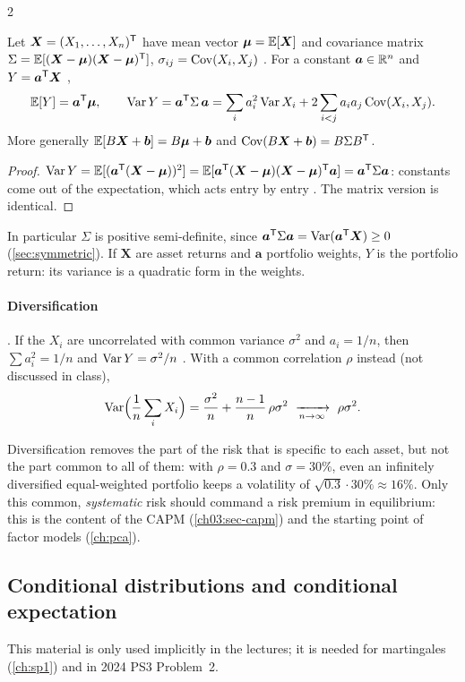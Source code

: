 \begin{paracol}{2}
\begin{proposition}\label{ch03:prop-portvar}
Let $\bm X=(X_1,\dots,X_n)^{\mathsf T}$ have mean vector $\bm\mu=\mathbb{E}[\bm X]$ and covariance matrix
$\Sigma=\mathbb{E}[(\bm X-\bm\mu)(\bm X-\bm\mu)^{\mathsf T}]$, $\sigma_{ij}=\operatorname{Cov}(X_i,X_j)$ . For a constant $\bm a\in\mathbb{R}^n$ and
$Y=\bm a^{\mathsf T}\bm X$ ,
\[
  \mathbb{E}[Y]=\bm a^{\mathsf T}\bm\mu,\qquad
  \operatorname{Var} Y=\bm a^{\mathsf T}\Sigma\,\bm a=\sum_ia_i^2\operatorname{Var} X_i+2\sum_{i<j}a_ia_j\operatorname{Cov}(X_i,X_j) .
\]
More generally $\mathbb{E}[B\bm X+\bm b]=B\bm\mu+\bm b$ and $\operatorname{Cov}(B\bm X+\bm b)=B\Sigma B^{\mathsf T}$.
\end{proposition}
\begin{proof}
$\operatorname{Var} Y=\mathbb{E}[(\bm a^{\mathsf T}(\bm X-\bm\mu))^2]=\mathbb{E}[\bm a^{\mathsf T}(\bm X-\bm\mu)(\bm X-\bm\mu)^{\mathsf T}\bm a]=\bm a^{\mathsf T}\Sigma\bm a$: constants come out of the
expectation, which acts entry by entry . The matrix version is identical.
\end{proof}
In particular $\Sigma$ is positive semi-definite, since $\bm a^{\mathsf T}\Sigma\bm a=\operatorname{Var}(\bm a^{\mathsf T}\bm X)\ge0$ (\cref{sec:symmetric}).
If $\bm X$ are asset returns and $\bm a$ portfolio weights, $Y$ is the portfolio return: its variance is a
quadratic form in the weights.

\paragraph{Diversification} . If the $X_i$ are uncorrelated with common variance
$\sigma^2$ and $a_i=1/n$, then $\sum a_i^2=1/n$ and $\operatorname{Var} Y=\sigma^2/n$ . With a common correlation
$\rho$ instead (not discussed in class),
\[
  \Var\Bigl(\frac1n\sum_iX_i\Bigr)=\frac{\sigma^2}{n}+\frac{n-1}{n}\,\rho\sigma^2\ \xrightarrow[n\to\infty]{}\ \rho\sigma^2 .
\]

\begin{finance}
Diversification removes the part of the risk that is specific to each asset, but not the part common to
all of them: with $\rho=0.3$ and $\sigma=30\%$, even an infinitely diversified equal-weighted portfolio keeps a
volatility of $\sqrt{0.3}\cdot30\%\approx16\%$. Only this common, \emph{systematic} risk should command a risk
premium in equilibrium: this is the content of the CAPM (\cref{ch03:sec-capm}) and the starting point of
factor models (\cref{ch:pca}).
\end{finance}

\subsection{Conditional distributions and conditional expectation}\label{ch03:sec-condexp}
This material is only used implicitly in the lectures; it is needed for martingales (\cref{ch:sp1}) and in
2024 PS3 Problem~2.


\end{paracol}
